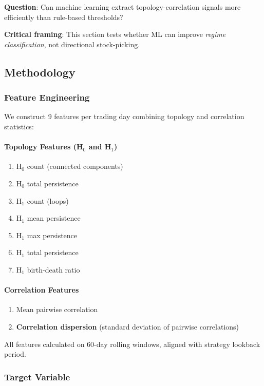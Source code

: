 \textbf{Question}: Can machine learning extract topology-correlation signals more efficiently than rule-based thresholds?

\textbf{Critical framing}: \mlguardrail{} This section tests whether ML can improve \textit{regime classification}, not directional stock-picking.

\subsection{Methodology}

\subsubsection{Feature Engineering}

We construct 9 features per trading day combining topology and correlation statistics:

\paragraph{Topology Features (H$_0$ and H$_1$)}
\begin{enumerate}
    \item H$_0$ count (connected components)
    \item H$_0$ total persistence
    \item H$_1$ count (loops)
    \item H$_1$ mean persistence
    \item H$_1$ max persistence
    \item H$_1$ total persistence
    \item H$_1$ birth-death ratio
\end{enumerate}

\paragraph{Correlation Features}
\begin{enumerate}
    \item[8.] Mean pairwise correlation
    \item[9.] \textbf{Correlation dispersion} (standard deviation of pairwise correlations)
\end{enumerate}

All features calculated on 60-day rolling windows, aligned with strategy lookback period.

\subsubsection{Target Variable}

